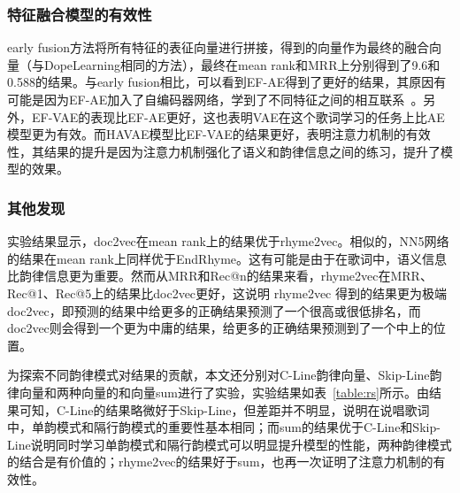 \subsubsection{特征融合模型的有效性}early fusion方法将所有特征的表征向量进行拼接，得到的向量作为最终的融合向量（与DopeLearning相同的方法），最终在mean rank和MRR上分别得到了9.6和0.588的结果。与early fusion相比，可以看到EF-AE得到了更好的结果，其原因有可能是因为EF-AE加入了自编码器网络，学到了不同特征之间的相互联系~\autocite{bengio2009learning}。另外，EF-VAE的表现比EF-AE更好，这也表明VAE在这个歌词学习的任务上比AE模型更为有效。而HAVAE模型比EF-VAE的结果更好，表明注意力机制的有效性，其结果的提升是因为注意力机制强化了语义和韵律信息之间的练习，提升了模型的效果。\par

\subsubsection{其他发现} \label{sssec:other}实验结果显示，doc2vec在mean rank上的结果优于rhyme2vec。相似的，NN5网络的结果在mean rank上同样优于EndRhyme。这有可能是由于在歌词中，语义信息比韵律信息更为重要。然而从MRR和Rec@n的结果来看，rhyme2vec在MRR、Rec@1、Rec@5上的结果比doc2vec更好，这说明 rhyme2vec 得到的结果更为极端doc2vec，即预测的结果中给更多的正确结果预测了一个很高或很低排名，而doc2vec则会得到一个更为中庸的结果，给更多的正确结果预测到了一个中上的位置。\par

\begin{table}[h]
  \caption{不同韵律模式的性能}
  \centering
    \renewcommand{\arraystretch}{1}
  \label{table:rs}
\end{table}

为探索不同韵律模式对结果的贡献，本文还分别对C-Line韵律向量、Skip-Line韵律向量和两种向量的和向量sum进行了实验，实验结果如表~\ref{table:rs}所示。由结果可知，C-Line的结果略微好于Skip-Line，但差距并不明显，说明在说唱歌词中，单韵模式和隔行韵模式的重要性基本相同；而sum的结果优于C-Line和Skip-Line说明同时学习单韵模式和隔行韵模式可以明显提升模型的性能，两种韵律模式的结合是有价值的；rhyme2vec的结果好于sum，也再一次证明了注意力机制的有效性。\par

